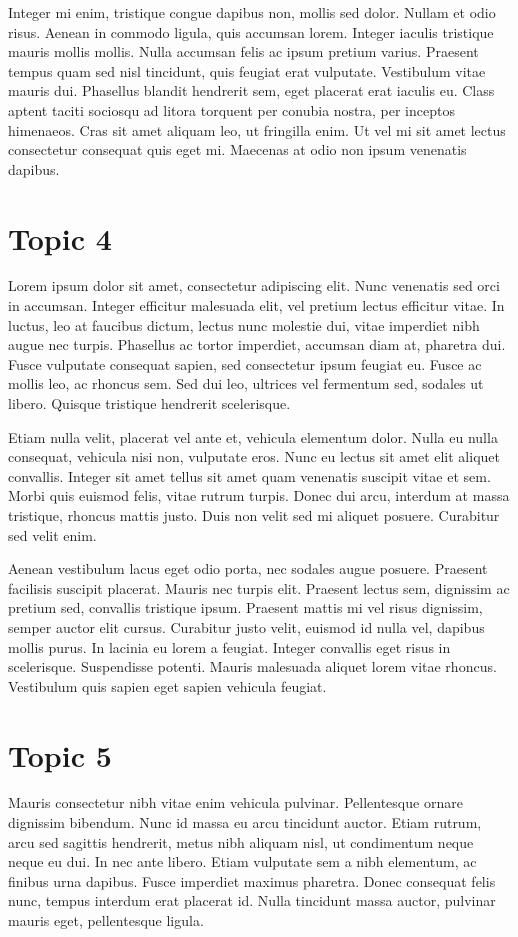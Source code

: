 \documentclass[10pt]{article}
\begin{document}
Integer mi enim, tristique congue dapibus non, mollis sed dolor. Nullam et odio risus. Aenean in commodo ligula, quis accumsan lorem. Integer iaculis tristique mauris mollis mollis. Nulla accumsan felis ac ipsum pretium varius. Praesent tempus quam sed nisl tincidunt, quis feugiat erat vulputate. Vestibulum vitae mauris dui. Phasellus blandit hendrerit sem, eget placerat erat iaculis eu. Class aptent taciti sociosqu ad litora torquent per conubia nostra, per inceptos himenaeos. Cras sit amet aliquam leo, ut fringilla enim. Ut vel mi sit amet lectus consectetur consequat quis eget mi. Maecenas at odio non ipsum venenatis dapibus. 


\section{Topic 4}
Lorem ipsum dolor sit amet, consectetur adipiscing elit. Nunc venenatis sed orci in accumsan. Integer efficitur malesuada elit, vel pretium lectus efficitur vitae. In luctus, leo at faucibus dictum, lectus nunc molestie dui, vitae imperdiet nibh augue nec turpis. Phasellus ac tortor imperdiet, accumsan diam at, pharetra dui. Fusce vulputate consequat sapien, sed consectetur ipsum feugiat eu. Fusce ac mollis leo, ac rhoncus sem. Sed dui leo, ultrices vel fermentum sed, sodales ut libero. Quisque tristique hendrerit scelerisque.

Etiam nulla velit, placerat vel ante et, vehicula elementum dolor. Nulla eu nulla consequat, vehicula nisi non, vulputate eros. Nunc eu lectus sit amet elit aliquet convallis. Integer sit amet tellus sit amet quam venenatis suscipit vitae et sem. Morbi quis euismod felis, vitae rutrum turpis. Donec dui arcu, interdum at massa tristique, rhoncus mattis justo. Duis non velit sed mi aliquet posuere. Curabitur sed velit enim.

Aenean vestibulum lacus eget odio porta, nec sodales augue posuere. Praesent facilisis suscipit placerat. Mauris nec turpis elit. Praesent lectus sem, dignissim ac pretium sed, convallis tristique ipsum. Praesent mattis mi vel risus dignissim, semper auctor elit cursus. Curabitur justo velit, euismod id nulla vel, dapibus mollis purus. In lacinia eu lorem a feugiat. Integer convallis eget risus in scelerisque. Suspendisse potenti. Mauris malesuada aliquet lorem vitae rhoncus. Vestibulum quis sapien eget sapien vehicula feugiat.
\section{Topic 5}
Mauris consectetur nibh vitae enim vehicula pulvinar. Pellentesque ornare dignissim bibendum. Nunc id massa eu arcu tincidunt auctor. Etiam rutrum, arcu sed sagittis hendrerit, metus nibh aliquam nisl, ut condimentum neque neque eu dui. In nec ante libero. Etiam vulputate sem a nibh elementum, ac finibus urna dapibus. Fusce imperdiet maximus pharetra. Donec consequat felis nunc, tempus interdum erat placerat id. Nulla tincidunt massa auctor, pulvinar mauris eget, pellentesque ligula.
\end{document}
